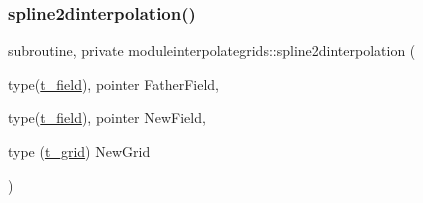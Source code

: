 \subsubsection{\texorpdfstring{spline2dinterpolation()}{spline2dinterpolation()}}
{\footnotesize\ttfamily subroutine, private moduleinterpolategrids\+::spline2dinterpolation (\begin{DoxyParamCaption}\item[{type(\mbox{\hyperlink{structmoduleinterpolategrids_1_1t__field}{t\+\_\+field}}), pointer}]{Father\+Field,  }\item[{type(\mbox{\hyperlink{structmoduleinterpolategrids_1_1t__field}{t\+\_\+field}}), pointer}]{New\+Field,  }\item[{type (\mbox{\hyperlink{structmoduleinterpolategrids_1_1t__grid}{t\+\_\+grid}})}]{New\+Grid }\end{DoxyParamCaption})\hspace{0.3cm}{\ttfamily [private]}}

